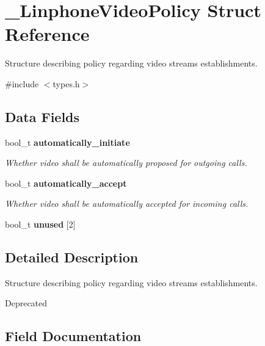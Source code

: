 \section{\+\_\+\+Linphone\+Video\+Policy Struct Reference}
\label{struct__LinphoneVideoPolicy}


Structure describing policy regarding video streams establishments.  




{\ttfamily \#include $<$types.\+h$>$}

\subsection*{Data Fields}
\begin{DoxyCompactItemize}
\item 
bool\+\_\+t \textbf{ automatically\+\_\+initiate}
\begin{DoxyCompactList}\small\item\em Whether video shall be automatically proposed for outgoing calls. \end{DoxyCompactList}\item 
\mbox{\label{struct__LinphoneVideoPolicy_ae94ea7330374ad7aebbddde76b13f0e4}} 
bool\+\_\+t \textbf{ automatically\+\_\+accept}
\begin{DoxyCompactList}\small\item\em Whether video shall be automatically accepted for incoming calls. \end{DoxyCompactList}\item 
\mbox{\label{struct__LinphoneVideoPolicy_ac7d12dd1fc0d851953e8047961155086}} 
bool\+\_\+t {\bfseries unused} [2]
\end{DoxyCompactItemize}


\subsection{Detailed Description}
Structure describing policy regarding video streams establishments. 

\begin{DoxyRefDesc}{Deprecated}
\item[\textbf{ Deprecated}] \end{DoxyRefDesc}


\subsection{Field Documentation}
\mbox{\label{struct__LinphoneVideoPolicy_af2844cb3185be244283d0dd310a0d7c9}} 

